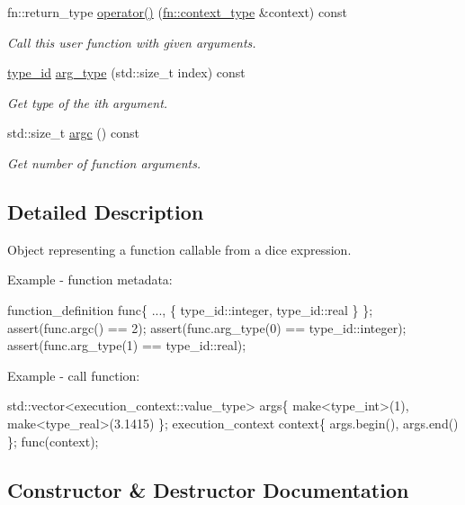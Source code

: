 \begin{DoxyCompactItemize}
\item 
fn\+::return\+\_\+type \mbox{\hyperlink{classdice_1_1function__definition_ae88e53c3dca93ccf845ecb894db7672b}{operator()}} (\mbox{\hyperlink{classdice_1_1execution__context}{fn\+::context\+\_\+type}} \&context) const
\begin{DoxyCompactList}\small\item\em Call this user function with given arguments. \end{DoxyCompactList}\item 
\mbox{\hyperlink{value_8hpp_ab9af7d8ecc381e026ca4d07a745f23eb}{type\+\_\+id}} \mbox{\hyperlink{classdice_1_1function__definition_a1aba35d197d5db50f229bc81f4f489d3}{arg\+\_\+type}} (std\+::size\+\_\+t index) const
\begin{DoxyCompactList}\small\item\em Get type of the ith argument. \end{DoxyCompactList}\item 
std\+::size\+\_\+t \mbox{\hyperlink{classdice_1_1function__definition_a5de84af8250e195aaf76bf84856d9aeb}{argc}} () const
\begin{DoxyCompactList}\small\item\em Get number of function arguments. \end{DoxyCompactList}\end{DoxyCompactItemize}


\subsection{Detailed Description}
Object representing a function callable from a dice expression. 

Example -\/ function metadata\+: 
\begin{DoxyCode}
function\_definition func\{ ..., \{ type\_id::integer, type\_id::real \} \};
assert(func.argc() == 2);
assert(func.arg\_type(0) == type\_id::integer);
assert(func.arg\_type(1) == type\_id::real);
\end{DoxyCode}


Example -\/ call function\+: 
\begin{DoxyCode}
std::vector<execution\_context::value\_type> args\{ 
     make<type\_int>(1), 
     make<type\_real>(3.1415) 
\};
execution\_context context\{ args.begin(), args.end() \};
func(context);
\end{DoxyCode}
 

\subsection{Constructor \& Destructor Documentation}
\mbox{\label{classdice_1_1function__definition_a002ceae34d8dba6d5a83da97fad28c62}} 
